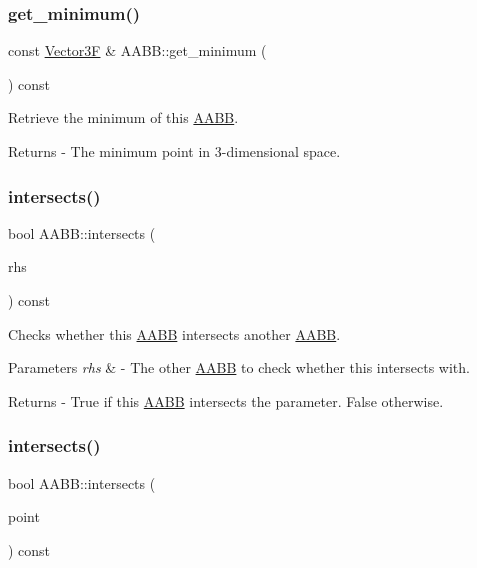 \subsubsection{\texorpdfstring{get\+\_\+minimum()}{get\_minimum()}}
{\footnotesize\ttfamily const \mbox{\hyperlink{class_vector3}{Vector3F}} \& A\+A\+B\+B\+::get\+\_\+minimum (\begin{DoxyParamCaption}{ }\end{DoxyParamCaption}) const}

Retrieve the minimum of this \mbox{\hyperlink{class_a_a_b_b}{A\+A\+BB}}. \begin{DoxyReturn}{Returns}
-\/ The minimum point in 3-\/dimensional space. 
\end{DoxyReturn}
\mbox{\label{class_a_a_b_b_a9c1cca9c55355340fffd6b4f707dd70d}} 
\subsubsection{\texorpdfstring{intersects()}{intersects()}\hspace{0.1cm}{\footnotesize\ttfamily [1/3]}}
{\footnotesize\ttfamily bool A\+A\+B\+B\+::intersects (\begin{DoxyParamCaption}\item[{const \mbox{\hyperlink{class_a_a_b_b}{A\+A\+BB}} \&}]{rhs }\end{DoxyParamCaption}) const}

Checks whether this \mbox{\hyperlink{class_a_a_b_b}{A\+A\+BB}} intersects another \mbox{\hyperlink{class_a_a_b_b}{A\+A\+BB}}. 
\begin{DoxyParams}{Parameters}
{\em rhs} & -\/ The other \mbox{\hyperlink{class_a_a_b_b}{A\+A\+BB}} to check whether this intersects with. \\
\hline
\end{DoxyParams}
\begin{DoxyReturn}{Returns}
-\/ True if this \mbox{\hyperlink{class_a_a_b_b}{A\+A\+BB}} intersects the parameter. False otherwise. 
\end{DoxyReturn}
\mbox{\label{class_a_a_b_b_ad517489d4c7a73d99ca28b126283daf0}} 
\subsubsection{\texorpdfstring{intersects()}{intersects()}\hspace{0.1cm}{\footnotesize\ttfamily [2/3]}}
{\footnotesize\ttfamily bool A\+A\+B\+B\+::intersects (\begin{DoxyParamCaption}\item[{const \mbox{\hyperlink{class_vector3}{Vector3F}} \&}]{point }\end{DoxyParamCaption}) const}

